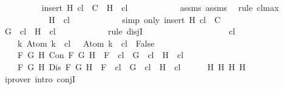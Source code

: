 \begin{isabellebody}
\ \ \ \ \ \ \ \ \isamarkupfalse%
\ {\isachardoublequoteopen}insert\ H\ {\isacharquery}cl\ {\isasymin}\ C\ {\isasymLongrightarrow}\ H\ {\isasymin}\ {\isacharquery}cl{\isachardoublequoteclose}\isanewline
\ \ \ \ \ \ \ \ \ \ \isamarkupfalse%
\ assms{\isacharparenleft}{}{\isacharparenright}\ assms{\isacharparenleft}{}{\isacharparenright}\ \isamarkupfalse%
\ {\isacharparenleft}rule\ cl{\isacharunderscore}max{\isacharprime}{\isacharparenright}\isanewline
\ \ \ \ \ \ \ \ \isamarkupfalse%
\ \isamarkupfalse%
\ {\isachardoublequoteopen}H\ {\isasymin}\ {\isacharquery}cl{\isachardoublequoteclose}\isanewline
\ \ \ \ \ \ \ \ \ \ \isamarkupfalse%
\ {\isacharparenleft}simp\ only{\isacharcolon}\ {\isacartoucheopen}insert\ H\ {\isacharquery}cl\ {\isasymin}\ C{\isacartoucheclose}{\isacharparenright}\isanewline
\ \ \ \ \ \ \ \ \isamarkupfalse%
\ {\isachardoublequoteopen}G\ {\isasymin}\ {\isacharquery}cl\ {\isasymor}\ H\ {\isasymin}\ {\isacharquery}cl{\isachardoublequoteclose}\isanewline
\ \ \ \ \ \ \ \ \ \ \isamarkupfalse%
\ {\isacharparenleft}rule\ disjI{}{\isacharparenright}\isanewline
\ \ \ \ \ \ \isamarkupfalse%
\isanewline
\ \ \ \ \isamarkupfalse%
\isanewline
\ \ \isamarkupfalse%
\isanewline
\ \ \isamarkupfalse%
\ {\isachardoublequoteopen}{\isasymbottom}\ {\isasymnotin}\ {\isacharquery}cl\ {\isasymand}\isanewline
\ \ \ \ {\isacharparenleft}{\isasymforall}k{\isachardot}\ Atom\ k\ {\isasymin}\ {\isacharquery}cl\ {\isasymlongrightarrow}\ \isactrlbold {\isasymnot}\ {\isacharparenleft}Atom\ k{\isacharparenright}\ {\isasymin}\ {\isacharquery}cl\ {\isasymlongrightarrow}\ False{\isacharparenright}\ {\isasymand}\isanewline
\ \ \ \ {\isacharparenleft}{\isasymforall}F\ G\ H{\isachardot}\ Con\ F\ G\ H\ {\isasymlongrightarrow}\ F\ {\isasymin}\ {\isacharquery}cl\ {\isasymlongrightarrow}\ G\ {\isasymin}\ {\isacharquery}cl\ {\isasymand}\ H\ {\isasymin}\ {\isacharquery}cl{\isacharparenright}\ {\isasymand}\isanewline
\ \ \ \ {\isacharparenleft}{\isasymforall}F\ G\ H{\isachardot}\ Dis\ F\ G\ H\ {\isasymlongrightarrow}\ F\ {\isasymin}\ {\isacharquery}cl\ {\isasymlongrightarrow}\ G\ {\isasymin}\ {\isacharquery}cl\ {\isasymor}\ H\ {\isasymin}\ {\isacharquery}cl{\isacharparenright}{\isachardoublequoteclose}\isanewline
\ \ \ \ \isamarkupfalse%
\ H{}\ H{}\ H{}\ H{}\ \isamarkupfalse%
\ {\isacharparenleft}iprover\ intro{\isacharcolon}\ conjI{\isacharparenright}\isanewline

\end{isabellebody}
